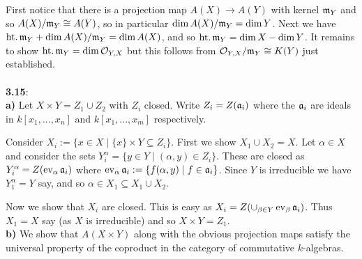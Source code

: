 \documentclass[12pt]{article}
\numberwithin{thm}{subsection}
\numberwithin{defn}{subsection}
\numberwithin{lemma}{subsection}
\numberwithin{example}{subsection}
\numberwithin{notation}{subsection}
\numberwithin{cor}{subsection}
\numberwithin{remark}{subsection}
\numberwithin{condition}{subsection}
\numberwithin{question}{subsection}
\numberwithin{construction}{subsection}
\numberwithin{construction}{subsection}
\numberwithin{construction}{subsection}
\newcommand{\call}[1]{\mathcal{#1}}
\newcommand{\lto}{\longrightarrow}
\begin{document}
First notice that there is a projection map $A(X) \lto A(Y)$ with kernel $\frak{m}_Y$ and so $A(X)/\frak{m}_Y \cong A(Y)$, so in particular $\operatorname{dim}A(X)/\frak{m}_Y = \operatorname{dim}Y$. Next we have $\operatorname{ht.}\frak{m}_Y + \operatorname{dim}A(X)/\frak{m}_Y = \operatorname{dim}A(X)$, and so $\operatorname{ht.}\frak{m}_Y = \operatorname{dim}X - \operatorname{dim}Y$. It remains to show $\operatorname{ht.}\frak{m}_Y = \operatorname{dim}\call{O}_{Y,X}$ but this follows from $\call{O}_{Y,X}/\frak{m}_Y \cong K(Y)$ just established.\\\\
%
\textbf{3.15}:\\
\textbf{a)} Let $X \times Y = Z_1 \cup Z_2$ with $Z_i$ closed. Write $Z_i = Z(\frak{a}_i)$ where the $\frak{a}_i$ are ideals in $k[x_1,...,x_n]$ and $k[x_1,...,x_m]$ respectively.

Consider $X_i := \lbrace x \in X \mid \lbrace x \rbrace \times Y \subseteq Z_i \rbrace$. First we show $X_1 \cup X_2 = X$. Let $\alpha \in X$ and consider the sets $Y^\alpha_i = \lbrace y \in Y \mid (\alpha,y) \in Z_i\rbrace$. These are closed as $Y^\alpha_i = Z(\operatorname{ev}_\alpha\frak{a}_i)$ where $\operatorname{ev}_\alpha\frak{a}_i := \lbrace f(\alpha,y) \mid f \in \frak{a}_i\rbrace$. Since $Y$ is irreducible we have $Y^\alpha_1 = Y$ say, and so $\alpha \in X_1 \subseteq X_1 \cup X_2$.

Now we show that $X_i$ are closed. This is easy as $X_i = Z(\cup_{\beta \in Y}\operatorname{ev}_\beta\frak{a}_i)$. Thus $X_1 = X$ say (as $X$ is irreducible) and so $X \times Y = Z_1$.\\
%
\textbf{b)} We show that $A(X\times Y)$ along with the obvious projection maps satisfy the universal property of the coproduct in the category of commutative $k$-algebras.
\end{document}
